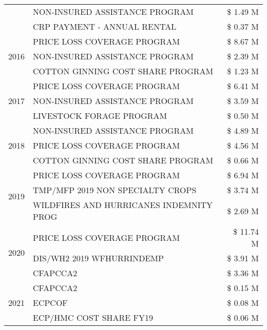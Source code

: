 \begin{tabular}{llr}
 & NON-INSURED ASSISTANCE PROGRAM & \$ 1.49 M \\
 & CRP PAYMENT - ANNUAL RENTAL & \$ 0.37 M \\
\cline{1-3}
\multirow[t]{3}{*}{2016} & PRICE LOSS COVERAGE PROGRAM                   & \$ 8.67 M \\
 & NON-INSURED ASSISTANCE PROGRAM                & \$ 2.39 M \\
 & COTTON GINNING COST SHARE PROGRAM             & \$ 1.23 M \\
\cline{1-3}
\multirow[t]{3}{*}{2017} & PRICE LOSS COVERAGE PROGRAM & \$ 6.41 M \\
 & NON-INSURED ASSISTANCE PROGRAM & \$ 3.59 M \\
 & LIVESTOCK FORAGE PROGRAM & \$ 0.50 M \\
\cline{1-3}
\multirow[t]{3}{*}{2018} & NON-INSURED ASSISTANCE PROGRAM & \$ 4.89 M \\
 & PRICE LOSS COVERAGE PROGRAM & \$ 4.56 M \\
 & COTTON GINNING COST SHARE PROGRAM & \$ 0.66 M \\
\cline{1-3}
\multirow[t]{3}{*}{2019} & PRICE LOSS COVERAGE PROGRAM & \$ 6.94 M \\
 & TMP/MFP 2019 NON SPECIALTY CROPS & \$ 3.74 M \\
 & WILDFIRES AND HURRICANES INDEMNITY PROG & \$ 2.69 M \\
\cline{1-3}
\multirow[t]{3}{*}{2020} & PRICE LOSS COVERAGE PROGRAM & \$ 11.74 M \\
 & DIS/WH2 2019 WFHURRINDEMP & \$ 3.91 M \\
 & CFAPCCA2 & \$ 3.36 M \\
\cline{1-3}
\multirow[t]{3}{*}{2021} & CFAPCCA2 & \$ 0.15 M \\
 & ECPCOF & \$ 0.08 M \\
 & ECP/HMC COST SHARE FY19 & \$ 0.06 M \\
\cline{1-3}
\bottomrule
\end{tabular}
